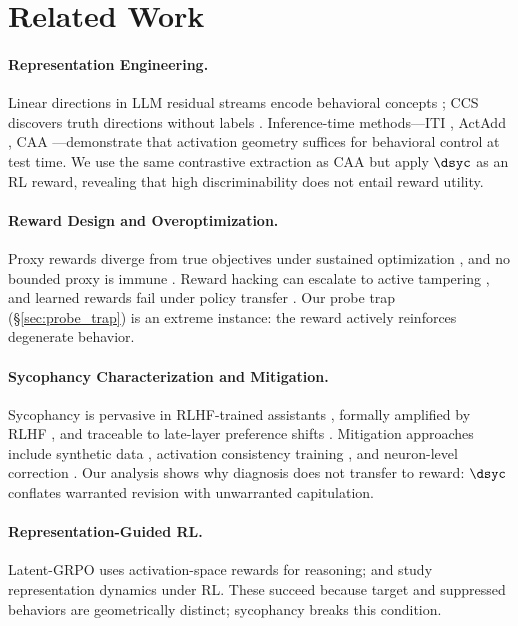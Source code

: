 \section{Related Work}\label{sec:related_work}

\paragraph{Representation Engineering.}
Linear directions in LLM residual streams encode behavioral concepts \citep{zou2023repe}; CCS discovers truth directions without labels \citep{burns2023ccs}.
Inference-time methods---ITI \citep{li2023iti}, ActAdd \citep{turner2023actadd}, CAA \citep{rimsky2024caa}---demonstrate that activation geometry suffices for behavioral control at test time.
We use the same contrastive extraction as CAA but apply $\dsyc$ as an RL reward, revealing that high discriminability does not entail reward utility.

\paragraph{Reward Design and Overoptimization.}
Proxy rewards diverge from true objectives under sustained optimization \citep{gao2023scaling}, and no bounded proxy is immune \citep{skalse2022hacking}.
Reward hacking can escalate to active tampering \citep{denison2024subterfuge}, and learned rewards fail under policy transfer \citep{mckinney2023fragility}.
Our probe trap (\S\ref{sec:probe_trap}) is an extreme instance: the reward actively reinforces degenerate behavior.

\paragraph{Sycophancy Characterization and Mitigation.}
Sycophancy is pervasive in RLHF-trained assistants \citep{sharma2023sycophancy}, formally amplified by RLHF \citep{shapira2026amplifies}, and traceable to late-layer preference shifts \citep{wang2025internal}.
Mitigation approaches include synthetic data \citep{wei2024synthetic}, activation consistency training \citep{consistency2025bctact}, and neuron-level correction \citep{obrien2025fewbadneurons}.
Our analysis shows why diagnosis does not transfer to reward: $\dsyc$ conflates warranted revision with unwarranted capitulation.

\paragraph{Representation-Guided RL.}
Latent-GRPO \citep{zhang2026latentgrpo} uses activation-space rewards for reasoning; \citet{sinii2025smallvectors} and \citet{ackermann2026gradreg} study representation dynamics under RL.
These succeed because target and suppressed behaviors are geometrically distinct; sycophancy breaks this condition.